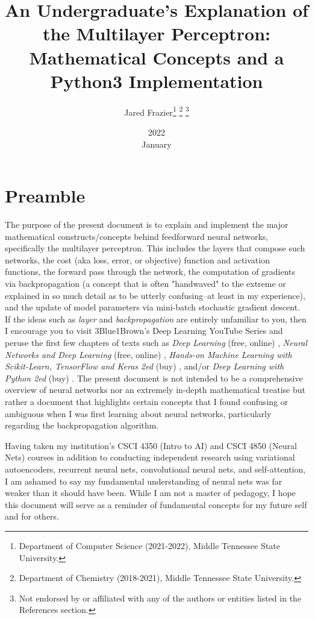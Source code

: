 \documentclass{article}
\title{
	An Undergraduate's Explanation of the Multilayer Perceptron: 
	Mathematical Concepts and a Python3 Implementation}
\date{2022 \\ January}
\author{Jared Frazier\thanks{Department of Computer Science (2021-2022),
Middle Tennessee State University.} \thanks{Department of Chemistry (2018-2021),
Middle Tennessee State University.} \thanks{Not endorsed by or affiliated with any of the 
authors or entities listed in the References section.}}
\begin{document}
\maketitle
\titlepage

\tableofcontents
\pagebreak

\section{Preamble}

The purpose of the present document is to explain and implement the major mathematical
constructs/concepts behind feedforward neural networks, specifically the multilayer perceptron.
This includes the layers that compose such networks, the cost (aka loss, error, or objective) function
and activation functions, the forward pass through the network,
the computation of gradients via backpropagation (a concept that is often "handwaved" to the extreme
or explained in so much detail as to be utterly confusing--at least in my experience),
and the update of model parameters via mini-batch stochastic gradient descent.
If the ideas such as \textit{layer} and \textit{backpropagation} are entirely unfamiliar
to you, then I encourage you to visit 3Blue1Brown's Deep Learning YouTube Series \cite{3Blue1BrownWhatIsANN2017}
and peruse the first few chapters of texts such as \textit{Deep Learning} (free, online) \cite{Goodfellow2016},
\textit{Neural Networks and Deep Learning} (free, online) \cite{Nielsen2015},
\textit{Hands-on Machine Learning with Scikit-Learn, TensorFlow and Keras 2ed} (buy) \cite{Geron2020},
and/or \textit{Deep Learning with Python 2ed} (buy) \cite{Chollet2021}. The present document
is not intended to be a comprehensive overview of neural networks nor an extremely
in-depth mathematical treatise but rather a document that highlights certain concepts that
I found confusing or ambiguous when I was first learning about neural networks,
particularly regarding the backpropagation algorithm.

Having taken my institution's CSCI 4350 (Intro to AI) and CSCI 4850 (Neural Nets)
courses in addition to conducting independent research using
variational autoencoders, recurrent neural nets, convolutional neural nets, and
self-attention, I am ashamed to say my fundamental understanding of neural nets
was far weaker than it should have been. While I am not a master of pedagogy,
I hope this document will serve as a reminder of fundamental concepts for my
future self and for others.
\end{document}
